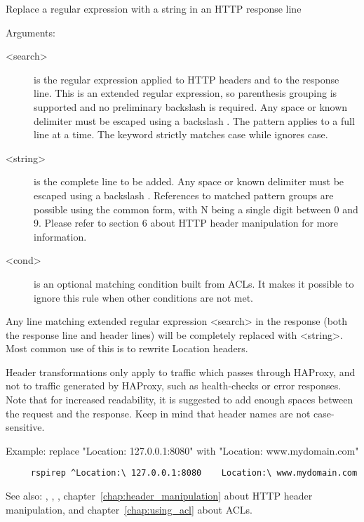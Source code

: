   Replace a regular expression with a string in an HTTP response line


  Arguments:
  \begin{description}
  \item[<search>] is the regular expression applied to HTTP headers and to the
              response line. This is an extended regular expression, so
              parenthesis grouping is supported and no preliminary backslash
              is required. Any space or known delimiter must be escaped using
              a backslash \chr{\bslash}. The pattern applies to a full line at a time.
              The  keyword strictly matches case while 
              ignores case.

  \item[<string>] is the complete line to be added. Any space or known delimiter
              must be escaped using a backslash \chr{\bslash}. References to matched
              pattern groups are possible using the common  form, with N
              being a single digit between 0 and 9. Please refer to section
              6 about HTTP header manipulation for more information.

  \item[<cond>] is an optional matching condition built from ACLs. It makes it
              possible to ignore this rule when other conditions are not met.
  \end{description}

  Any line matching extended regular expression <search> in the response (both
  the response line and header lines) will be completely replaced with
  <string>. Most common use of this is to rewrite Location headers.

  Header transformations only apply to traffic which passes through HAProxy,
  and not to traffic generated by HAProxy, such as health-checks or error
  responses. Note that for increased readability, it is suggested to add enough
  spaces between the request and the response. Keep in mind that header names
  are not case-sensitive.

  Example: replace "Location: 127.0.0.1:8080" with "Location: www.mydomain.com"
  \begin{verbatim}
     rspirep ^Location:\ 127.0.0.1:8080    Location:\ www.mydomain.com
  \end{verbatim}


See also: , , , chapter~\ref{chap:header_manipulation}
  about HTTP header manipulation, and chapter~\ref{chap:using_acl} about ACLs.

